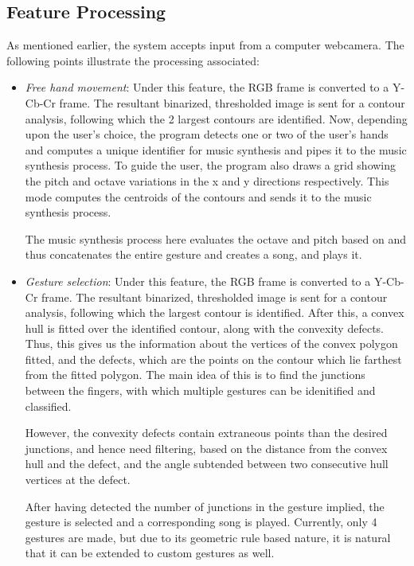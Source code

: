 \documentclass[letterpaper, 10 pt, twoside, conference]{ieeeconf}
\begin{document}
\subsection{Feature Processing}
  As mentioned earlier, the system accepts input from a computer webcamera. The following points illustrate
  the processing associated:
  \begin{itemize}
    \item \textit{Free hand movement}: Under this feature, the RGB frame is converted to a Y-Cb-Cr frame. The
      resultant binarized, thresholded image is sent for a contour analysis, following which the 2 largest
      contours are identified. Now, depending upon the user's choice, the program detects one or two of the user's
      hands and computes a unique identifier for music synthesis and pipes it to the music synthesis process. To guide
      the user, the program also draws a grid showing the pitch and octave variations in the x and y directions
      respectively. This mode computes the centroids of the contours and sends it to the music synthesis process.

      The music synthesis process here evaluates the octave and pitch based on %
      and thus concatenates the entire gesture and creates a song, and plays it.
      \par\null\par
    \item \textit{Gesture selection}: Under this feature, the RGB frame is converted to a Y-Cb-Cr frame. The
      resultant binarized, thresholded image is sent for a contour analysis, following which the largest contour
      is identified. After this, a convex hull is fitted over the identified contour, along with the convexity defects.
      Thus, this gives us the information about the vertices of the convex polygon fitted, and the defects,
      which are the points on the contour which lie farthest from the fitted polygon. The main idea of this is
      to find the junctions between the fingers, with which multiple gestures can be idenitified and classified.
      
      However, the convexity defects contain extraneous points than the desired junctions, and hence need filtering,
      based on the distance from the convex hull and the defect, and the angle subtended between two consecutive
      hull vertices at the defect.

      After having detected the number of junctions in the gesture implied, the gesture is selected and a corresponding
      song is played. Currently, only 4 gestures are made, but due to its geometric rule based nature, it is natural that
      it can be extended to custom gestures as well.

  \end{itemize}
\end{document}
